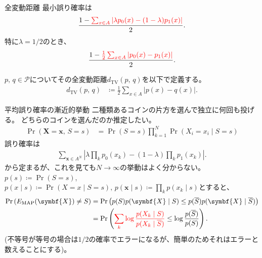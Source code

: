 \documentclass[lualatex,handout]{beamer}
\newcommand{\mycolor}[2]{%
  \begingroup
  \colorlet{currentcolor}{.}%
  \color{#1}#2%
  \color{currentcolor}%
  \endgroup
}
\newcommand{\emm}[1]{\mycolor{red}{#1}}
\newcommand\dtv{d_{\mathrm{TV}}}
\theoremstyle{definition}
\begin{document}
\begin{frame}{全変動距離}
最小誤り確率は
\begin{align*}
\frac{1-\emm{\sum_{x\in A}\left|\lambda p_0(x) - (1-\lambda) p_1(x) \right|}}2.
\end{align*}
特に$\lambda=1/2$のとき、
\begin{align*}
\frac{1-\emm{\frac12\sum_{x\in A}\left|p_0(x) - p_1(x) \right|}}2.
\end{align*}
\begin{definition}
$p,\, q\in\mathcal{P}$についてその全変動距離$\dtv(p,\,q)$を以下で定義する。
\begin{align*}
\dtv(p,\, q) &\coloneq
\frac12\sum_{x\in A}\left|p(x) - q(x) \right|.
\end{align*}
\end{definition}
\end{frame}



\begin{frame}{平均誤り確率の漸近的挙動}
\small
二種類あるコインの片方を選んで独立に何回も投げる。
どちらのコインを選んだのか推定したい。
\begin{align*}
\Pr(\symbf{X}=\symbf{x},\, S= s) &= \Pr(S=s)\prod_{k=1}^N \Pr(X_i=x_i \mid S=s)
\end{align*}
誤り確率は
\begin{align*}
\sum_{\symbf{x}\in A^N}\left|\lambda\prod_k p_0(x_k) - (1-\lambda)\prod_kp_1(x_k) \right|.
\end{align*}
から定まるが、これを見ても$N\to\infty$の挙動はよく分からない。
$p(s)\coloneq \Pr(S=s)$,
$p(x\mid s) \coloneq \Pr(X=x\mid S=s),\, p(\symbf{x}\mid s)\coloneq \prod_k p(x_k\mid s)$とすると、
\begin{align*}
\Pr\left(E_{\mathrm{MAP}}(\symbf{X}) \ne S\right)
&= \Pr\left(p(S) p(\symbf{X}\mid S) \le p(\overline{S}) p(\symbf{X}\mid \overline{S})\right)\\
&= \Pr\left(\emm{\sum_k \log\frac{p(X_k\mid S)}{p(X_k\mid \overline{S})}} \le \log\frac{p(\overline{S})}{p(S)}\right).
\end{align*}
(不等号が等号の場合は$1/2$の確率でエラーになるが、簡単のためそれはエラーと数えることにする)。
\end{frame}
\end{document}
